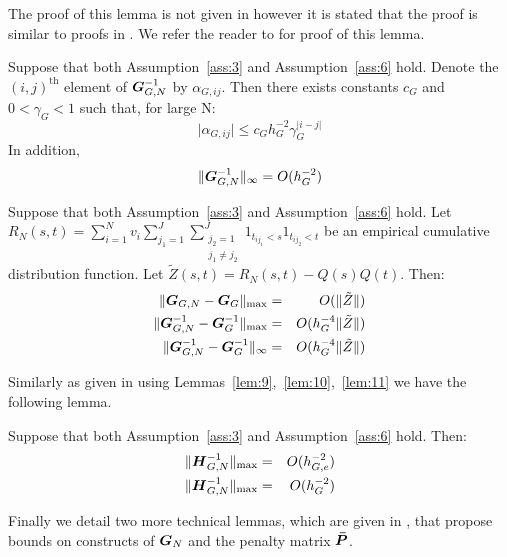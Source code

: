 The proof of this lemma is not given in \citep{xiao_asymptotic_2020} however it is stated that the proof is similar to proofs in \citep{xiao_asymptotic_2019}. 
We refer the reader to \citep{xiao_asymptotic_2019} for proof of this lemma. 
\begin{lemma}
	Suppose that both Assumption~\ref{ass:3} and Assumption~\ref{ass:6} hold.
	Denote the $(i,j)^\text{th}$ element of $\bm{{G}}_{G, N}^{-1}$ by $\alpha_{G, ij}$.
	Then there exists constants $c_G$ and $0 < \gamma_G < 1$ such that, for large N:
	\begin{equation}
		\lvert \alpha_{G, ij} \rvert \leq c_G h_{G}^{-2} \gamma_{G}^{\lvert i -j \rvert}
	\end{equation}
	In addition,
	\begin{equation}
		\lVert \bm{{G}}_{G, N}^{-1} \rVert_\infty = O(h_G^{-2})
	\end{equation}
	\label{lem:10}
\end{lemma}
\begin{lemma}
	Suppose that both Assumption~\ref{ass:3} and Assumption~\ref{ass:6} hold.
	Let $R_N(s,t) = \sum_{i=1}^N v_i  \sum_{j_1=1}^J \sum_{\substack{j_2=1 \\ j_1 \ne j_2}}^J 1_{t_{ij_1}< s} 1_{t_{ij_2} < t}$ be an empirical cumulative distribution function.
	Let $\tilde{Z}(s,t) = R_N(s,t) - Q(s)Q(t)$.
	Then:
	\begin{eqnarray}
		\lVert \bm{{G}}_{G,N} - \bm{{G}}_{G} \rVert_\text{max} &=& O(\lVert \tilde{Z} \rVert) \\
		\lVert \bm{{G}}_{G,N}^{-1} - \bm{{G}}_{G}^{-1} \rVert_\text{max} &=& O(h_G^{-4}\lVert \tilde{Z} \rVert) \\
		\lVert \bm{{G}}_{G,N}^{-1} - \bm{{G}}_{G}^{-1} \rVert_\infty &=& O(h_G^{-4}\lVert \tilde{Z} \rVert)
	\end{eqnarray}
	\label{lem:11} 
\end{lemma}
Similarly as given in \citep{xiao_asymptotic_2020} using Lemmas~\ref{lem:9},~\ref{lem:10},~\ref{lem:11} we have the following lemma.
\begin{lemma}
	Suppose that both Assumption~\ref{ass:3} and Assumption~\ref{ass:6} hold.
	Then:
	\begin{eqnarray}
		\lVert \bm{{H}}_{G, N}^{-1} \rVert_\text{max} &=& O(h_{G,e}^{-2}) \\
		\lVert \bm{{H}}_{G, N}^{-1} \rVert_\text{max} &=& O(h_{G}^{-2})
	\end{eqnarray}
	\label{lem:12}
\end{lemma}
Finally we detail two more technical lemmas, which are given in \citep{xiao_asymptotic_2020}, that propose bounds on constructs of $\bm{{G}}_{N}$ and the penalty matrix $\bm{{\bar{P}}}$.
